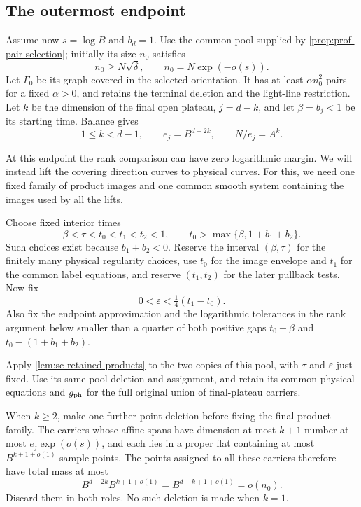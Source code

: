 \subsection{The outermost endpoint}

Assume now $s=\log B$ and $b_d=1$.  Use the common pool supplied by \cref{prop:prof-pair-selection}; initially its size $n_0$ satisfies
\begin{equation}\label{eq:sc-outer-pool}
 n_0\ge N\sqrt\delta,\qquad n_0=N\exp(-o(s)).
\end{equation}
Let $\Gamma_0$ be its graph covered in the selected orientation.  It has at least $\alpha n_0^2$ pairs for a fixed $\alpha>0$, and retains the terminal deletion and the light-line restriction.  Let $k$ be the dimension of the final open plateau, $j=d-k$, and let $\beta=b_j<1$ be its starting time.  Balance gives
\begin{equation}\label{eq:sc-outer-budgets}
 1\le k<d-1,\qquad e_j=B^{d-2k},\qquad N/e_j=A^k.
\end{equation}

At this endpoint the rank comparison can have zero logarithmic margin. We will instead lift the covering direction curves to physical curves. For this, we need one fixed family of product images and one common smooth system containing the images used by all the lifts.

Choose fixed interior times
\begin{equation}\label{eq:sc-outer-time-choice}
 \beta<\tau<t_0<t_1<t_2<1,
 \qquad t_0>\max\{\beta,1+b_1+b_2\}.
\end{equation}
Such choices exist because $b_1+b_2<0$.  Reserve the interval $(\beta,\tau)$ for the finitely many physical regularity choices, use $t_0$ for the image envelope and $t_1$ for the common label equations, and reserve $(t_1,t_2)$ for the later pullback tests.  Now fix
\[
 0<\varepsilon<\tfrac14(t_1-t_0).
\]
Also fix the endpoint approximation and the logarithmic tolerances in the rank argument below smaller than a quarter of both positive gaps $t_0-\beta$ and $t_0-(1+b_1+b_2)$.

Apply \cref{lem:sc-retained-products} to the two copies of this pool, with $\tau$ and $\varepsilon$ just fixed.  Use its same-pool deletion and assignment, and retain its common physical equations and $g_{\rm ph}$ for the full original union of final-plateau carriers.

When $k\ge2$, make one further point deletion before fixing the final product family.  The carriers whose affine spans have dimension at most $k+1$ number at most $e_j\exp(o(s))$, and each lies in a proper flat containing at most $B^{k+1+o(1)}$ sample points.  The points assigned to all these carriers therefore have total mass at most
\[
 B^{d-2k}B^{k+1+o(1)}=B^{d-k+1+o(1)}=o(n_0).
\]
Discard them in both roles.  No such deletion is made when $k=1$.

